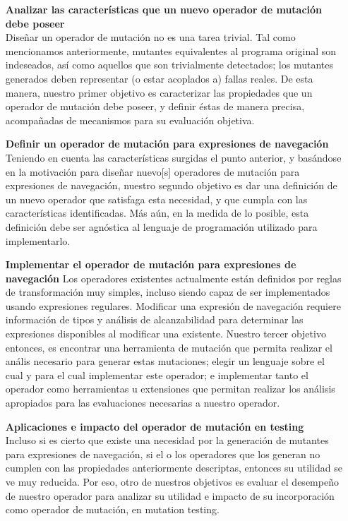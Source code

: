 \begin{enumerate}[leftmargin=.75cm,align=left,style=nextline]
	\item[\textbf{Analizar las caracter\'isticas que un nuevo operador de mutaci\'on debe poseer}]\mbox{}\\ Dise\~nar un operador de mutaci\'on no es una tarea trivial. Tal como mencionamos anteriormente, mutantes equivalentes al programa original son indeseados, as\'i como aquellos que son trivialmente detectados; los mutantes generados deben representar (o estar acoplados a) fallas reales. De esta manera, nuestro primer objetivo es caracterizar las propiedades que un operador de mutaci\'on debe poseer, y definir \'estas de manera precisa, acompa\~nadas de mecanismos para su evaluaci\'on objetiva. 
	
	\item[\textbf{Definir un operador de mutaci\'on para expresiones de navegaci\'on}]\mbox{}\\
	Teniendo en cuenta las caracter\'isticas surgidas el punto anterior, y bas\'andose en la motivaci\'on para dise\~nar nuevo[s] operadores de mutaci\'on para expresiones de navegaci\'on, nuestro segundo objetivo es dar una definici\'on de un nuevo operador que satisfaga esta necesidad, y que cumpla con las caracter\'isticas identificadas. M\'as a\'un, en la medida de lo posible, esta definici\'on debe ser agn\'ostica al lenguaje de programaci\'on utilizado para implementarlo.
	
	\item[\textbf{Implementar el operador de mutaci\'on para expresiones de navegaci\'on}] Los operadores existentes actualmente est\'an definidos por reglas de transformaci\'on muy simples, incluso siendo capaz de ser implementados usando expresiones regulares. Modificar una expresi\'on de navegaci\'on requiere informaci\'on de tipos y an\'alisis de alcanzabilidad para determinar las expresiones disponibles al modificar una existente. Nuestro tercer objetivo entonces, es encontrar una herramienta de mutaci\'on que permita realizar el an\'alis necesario para generar estas mutaciones; elegir un lenguaje sobre el cual y para el cual implementar este operador; e implementar tanto el operador como herramientas u extensiones que permitan realizar los an\'alisis apropiados para las evaluaciones necesarias a nuestro operador.
	
	\item[\textbf{Aplicaciones e impacto del operador de mutaci\'on en testing}]\mbox{}\\
	Incluso si es cierto que existe una necesidad por la generaci\'on de mutantes para expresiones de navegaci\'on, si el o los operadores que los generan no cumplen con las propiedades anteriormente descriptas, entonces su utilidad se ve muy reducida. Por eso, otro de nuestros objetivos es evaluar el desempe\~no de nuestro operador para analizar su utilidad e impacto de su incorporaci\'on como operador de mutaci\'on, en mutation testing. 
	

\end{enumerate}
